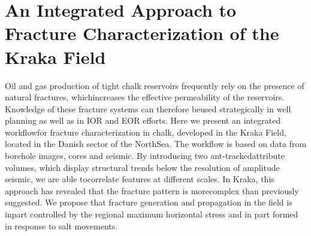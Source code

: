 \chapter{An Integrated Approach to Fracture Characterization of the Kraka
Field}

Oil and gas production of tight chalk reservoirs frequently rely on the presence of natural fractures, whichincreases the effective permeability of the reservoirs.  Knowledge of these fracture systems can therefore beused strategically in well planning as well as in IOR and EOR efforts.  Here we present an integrated workflowfor fracture characterization in chalk, developed in the Kraka Field, located in the Danish sector of the NorthSea.  The workflow is based on data from borehole images, cores and seismic.  By introducing two ant-trackedattribute volumes, which display structural trends below the resolution of amplitude seismic, we are able tocorrelate features at different scales.  In Kraka, this approach has revealed that the fracture pattern is morecomplex than previously suggested.  We propose that fracture generation and propagation in the field is inpart controlled by the regional maximum horizontal stress and in part formed in response to salt movements.

{\vfill\hfill\newline{}}



